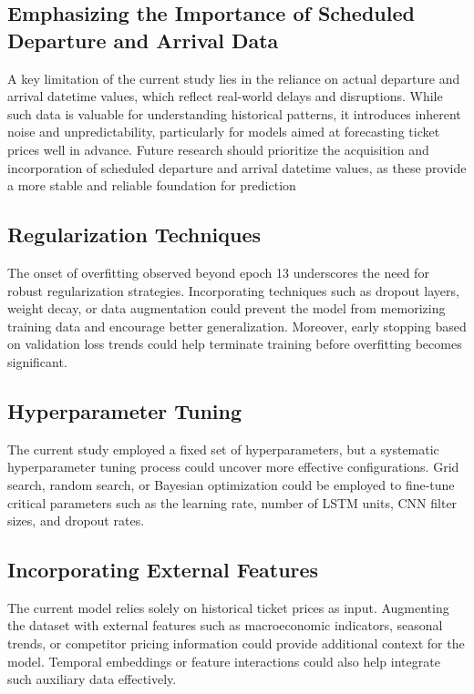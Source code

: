 \documentclass[conference]{IEEEtran}
\begin{document}
\subsection{Emphasizing the Importance of Scheduled Departure and Arrival Data}
A key limitation of the current study lies in the reliance on actual departure and arrival datetime values, which reflect real-world delays and disruptions. While such data is valuable for understanding historical patterns, it introduces inherent noise and unpredictability, particularly for models aimed at forecasting ticket prices well in advance. Future research should prioritize the acquisition and incorporation of scheduled departure and arrival datetime values, as these provide a more stable and reliable foundation for prediction

\subsection{Regularization Techniques}
The onset of overfitting observed beyond epoch 13 underscores the need for robust regularization strategies. Incorporating techniques such as dropout layers, weight decay, or data augmentation could prevent the model from memorizing training data and encourage better generalization. Moreover, early stopping based on validation loss trends could help terminate training before overfitting becomes significant.

\subsection{Hyperparameter Tuning}
The current study employed a fixed set of hyperparameters, but a systematic hyperparameter tuning process could uncover more effective configurations. Grid search, random search, or Bayesian optimization could be employed to fine-tune critical parameters such as the learning rate, number of LSTM units, CNN filter sizes, and dropout rates.

\subsection{Incorporating External Features}
The current model relies solely on historical ticket prices as input. Augmenting the dataset with external features such as macroeconomic indicators, seasonal trends, or competitor pricing information could provide additional context for the model. Temporal embeddings or feature interactions could also help integrate such auxiliary data effectively.
\end{document}
